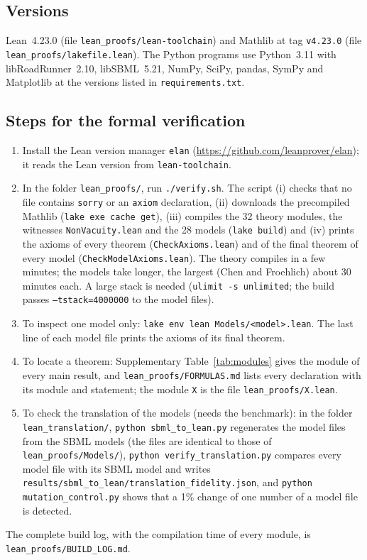 \subsection*{Versions}
Lean~4.23.0 (file \texttt{lean\_proofs/lean-toolchain}) and Mathlib at tag \texttt{v4.23.0} (file \texttt{lean\_proofs/lakefile.lean}). The Python programs use Python~3.11 with libRoadRunner~2.10, libSBML~5.21, NumPy, SciPy, pandas, SymPy and Matplotlib at the versions listed in \texttt{requirements.txt}.

\subsection*{Steps for the formal verification}
\begin{enumerate}\itemsep0pt
\item Install the Lean version manager \texttt{elan} (\url{https://github.com/leanprover/elan}); it reads the Lean version from \texttt{lean-toolchain}.
\item In the folder \texttt{lean\_proofs/}, run \texttt{./verify.sh}. The script (i) checks that no file contains \texttt{sorry} or an \texttt{axiom} declaration, (ii) downloads the precompiled Mathlib (\texttt{lake exe cache get}), (iii) compiles the 32 theory modules, the witnesses \texttt{NonVacuity.lean} and the 28 models (\texttt{lake build}) and (iv) prints the axioms of every theorem (\texttt{CheckAxioms.lean}) and of the final theorem of every model (\texttt{CheckModelAxioms.lean}). The theory compiles in a few minutes; the models take longer, the largest (Chen and Froehlich) about 30 minutes each. A large stack is needed (\texttt{ulimit -s unlimited}; the build passes \texttt{--tstack=4000000} to the model files).
\item To inspect one model only: \texttt{lake env lean Models/<model>.lean}. The last line of each model file prints the axioms of its final theorem.
\item To locate a theorem: Supplementary Table~\ref{tab:modules} gives the module of every main result, and \texttt{lean\_proofs/FORMULAS.md} lists every declaration with its module and statement; the module \texttt{X} is the file \texttt{lean\_proofs/X.lean}.
\item To check the translation of the models (needs the benchmark): in the folder \texttt{lean\_translation/}, \texttt{python sbml\_to\_lean.py} regenerates the model files from the SBML models (the files are identical to those of \texttt{lean\_proofs/Models/}), \texttt{python verify\_translation.py} compares every model file with its SBML model and writes \texttt{results/sbml\_to\_lean/translation\_fidelity.json}, and \texttt{python mutation\_control.py} shows that a 1\% change of one number of a model file is detected.
\end{enumerate}
The complete build log, with the compilation time of every module, is \texttt{lean\_proofs/BUILD\_LOG.md}.


